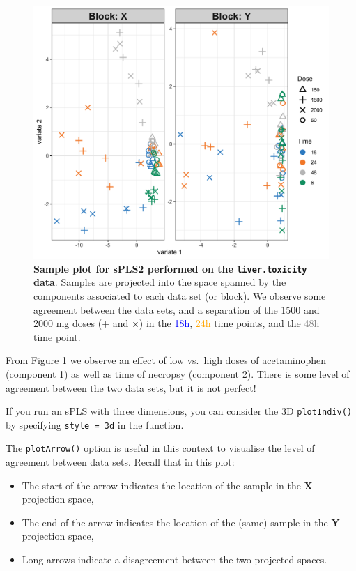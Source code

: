 \documentclass[]{book}
\providecommand{\tightlist}{%
  \setlength{\itemsep}{0pt}\setlength{\parskip}{0pt}}
\begin{document}
\begin{figure}

{\centering \includegraphics[width=0.5\linewidth]{Figures/PLS/spls2-plotIndiv-1} 

}

\caption{\textbf{Sample plot for sPLS2 performed on the
\texttt{liver.toxicity} data}. Samples are projected into the space
spanned by the components associated to each data set (or block). We
observe some agreement between the data sets, and a separation of the
1500 and 2000 mg doses (\(+\) and \(\times\)) in the
\textcolor{blue}{18h}, \textcolor{orange}{24h} time points, and the
\textcolor{grey}{48h} time point.}\label{fig:spls2-plotIndiv}
\end{figure}









From Figure \ref{fig:spls2-plotIndiv} we observe an effect of low
vs.~high doses of acetaminophen (component 1) as well as time of
necropsy (component 2). There is some level of agreement between the two
data sets, but it is not perfect!

If you run an sPLS with three dimensions, you can consider the 3D
\texttt{plotIndiv()} by specifying
\texttt{style\ =\ \textquotesingle{}3d\textquotesingle{}} in the
function.

The \texttt{plotArrow()} option is useful in this context to visualise
the level of agreement between data sets. Recall that in this plot:

\begin{itemize}
\tightlist
\item
  The start of the arrow indicates the location of the sample in the
  \(\boldsymbol X\) projection space,
\item
  The end of the arrow indicates the location of the (same) sample in
  the \(\boldsymbol Y\) projection space,
\item
  Long arrows indicate a disagreement between the two projected spaces.
\end{itemize}
\end{document}
